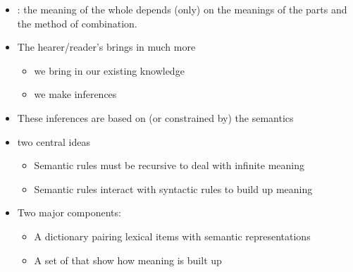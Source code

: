 \documentclass[a4paper,landscape,headrule,footrule,xetex]{foils}
\begin{document}
\begin{itemize}
\item {}: the meaning of the whole depends (only)
  on the meanings of the parts and the method of combination.
\item The hearer/reader's  brings in much more
  \begin{itemize}
  \item we bring in our existing knowledge
  \item we make inferences
  \end{itemize}
\item These inferences are based on (or constrained by) the semantics 
\item two central ideas \citep[formalized by: ][]{Katz:Fodor:1963}
  \begin{itemize}
  \item Semantic rules must be recursive to deal with infinite meaning
  \item Semantic rules interact with syntactic rules to build up meaning
  \end{itemize}
\item Two major components:
  \begin{itemize}
  \item A dictionary pairing lexical items with semantic representations
  \item A set of  that show how meaning is built up
  \end{itemize}
\end{itemize}

\end{document}
